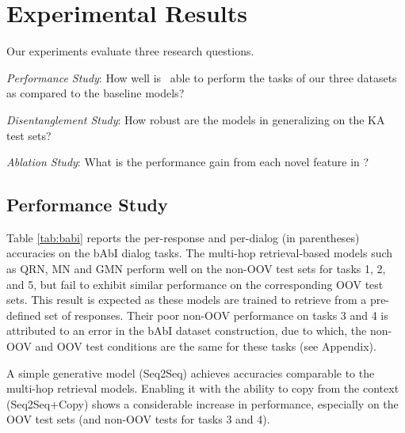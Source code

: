 \section{Experimental Results}
\label{sec:experiments}

Our experiments evaluate three research questions. 
\begin{compactenum}
    \item \emph{Performance Study}: How well is \sys\ able to perform the tasks of our three datasets as compared to the baseline models? 
    \item \emph{Disentanglement Study}: How robust are the models in generalizing on the KA test sets? 
    \item \emph{Ablation Study}: What is the performance gain from each novel feature in \sys? 
\end{compactenum}

\subsection{Performance Study}
\label{sec:expt2}

Table \ref{tab:babi} reports the per-response and per-dialog (in parentheses) accuracies on the bAbI dialog tasks.
The multi-hop retrieval-based models such as QRN, MN and GMN perform well on the non-OOV test sets for tasks 1, 2, and 5, but fail to exhibit similar performance on the corresponding OOV test sets. This result is expected as these models are trained to retrieve from a pre-defined set of responses. Their poor non-OOV performance on tasks 3 and 4 is attributed to an error in the bAbI dataset construction, due to which, the non-OOV and OOV test conditions are the same for these tasks (see Appendix).

A simple generative model (Seq2Seq) achieves accuracies comparable to the multi-hop retrieval models. Enabling it with the ability to copy from the context (Seq2Seq+Copy) shows a considerable increase in performance, especially on the OOV test sets (and non-OOV tests for tasks 3 and 4).

